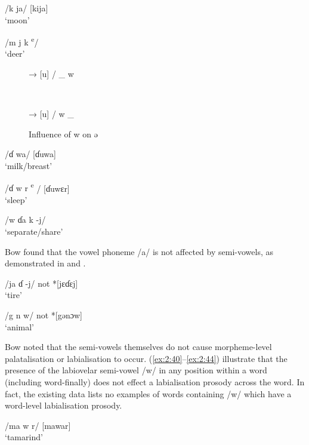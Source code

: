 \ea \label{ex:2:33}
\textup{/k ja/   \ExampleSpace \hspace{10pt} [kija] }\\
\glt  ‘moon’  
\z

\ea \label{ex:2:34}
\textup{/m j k }\textup{\textsuperscript{e}}\textup{/  \ExampleSpace  [mijɛk] }\\
\glt  ‘deer’
\z

\begin{figure}\caption{Influence of w on ə\label{fig:2.5}}
\begin{centering}[ə] → [u] / \_ w\end{centering}\\
\begin{centering}[ə] → [u] / w \_\end{centering}
\end{figure}


\ea \label{ex:2:35}
\textup{/ɗ wa/  \ExampleSpace \hspace{15pt}   [ɗuwa] }\\
\glt  ‘milk/breast’    
\z

\ea \label{ex:2:36}
\textup{/ɗ w r \textsuperscript{e}}\textup{ /   \ExampleSpace  \hspace{5pt} [ɗuwɛr] }\\
\glt  ‘sleep’
\z

\ea \label{ex:2:37}
\textup{/w ɗa k -j/  \ExampleSpace   [wuɗakaj]  }\\
\glt  ‘separate/share’
\z

Bow found that the vowel phoneme /a/ is not affected by semi-vowels, as demonstrated in  and .

\ea \label{ex:2:38}
\textup{/ja ɗ -j/  \ExampleSpace    [jaɗaj]    not *[jɛɗɛj]}\\
\glt  ‘tire’   
\z

\ea \label{ex:2:39}
\textup{/g n w/   \ExampleSpace [gənaw]     not *[gənɔw]}\\
\glt  ‘animal’    
\z

Bow noted that the semi-vowels themselves do not cause morpheme-level palatalisation or labialisation to occur.  (\ref{ex:2:40}--\ref{ex:2:44}) illustrate that the presence of the labiovelar semi-vowel /w/ in any position within a word (including word-finally) does not effect a labialisation prosody across the word. In fact, the existing data lists no examples of words containing /w/ which have a word-level labialisation prosody.

\ea \label{ex:2:40}
\textup{/ma w r/    \ExampleSpace  \hspace{12pt} [mawar]}\\
\glt  ‘tamarind’   
\z

